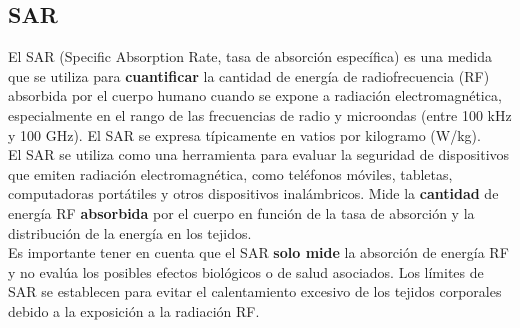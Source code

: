 \documentclass[
	12pt, %
	fleqn, %
	a4paper, %
	oneside, %
]{LegrandOrangeBook}
\begin{document}
\subsection{SAR}
El SAR (Specific Absorption Rate, tasa de absorción específica) es una medida que se utiliza para \textbf{cuantificar} la cantidad de energía de radiofrecuencia (RF) absorbida por el cuerpo humano cuando se expone a radiación electromagnética, especialmente en el rango de las frecuencias de radio y microondas (entre 100 kHz y 100 GHz). El SAR se expresa típicamente en vatios por kilogramo (W/kg).\\
El SAR se utiliza como una herramienta para evaluar la seguridad de dispositivos que emiten radiación electromagnética, como teléfonos móviles, tabletas, computadoras portátiles y otros dispositivos inalámbricos. Mide la \textbf{cantidad} de energía RF \textbf{absorbida} por el cuerpo en función de la tasa de absorción y la distribución de la energía en los tejidos.\\
Es importante tener en cuenta que el SAR \textbf{solo mide} la absorción de energía RF y no evalúa los posibles efectos biológicos o de salud asociados. Los límites de SAR se establecen para evitar el calentamiento excesivo de los tejidos corporales debido a la exposición a la radiación RF.
\end{document}
